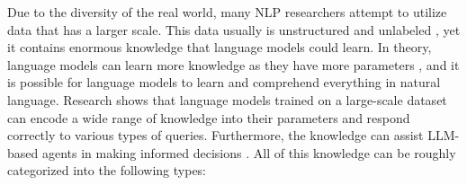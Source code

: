 Due to the diversity of the real world, many NLP researchers attempt to utilize data that has a larger scale. This data usually is unstructured and unlabeled \cite{DBLP:conf/naacl/HillCK16,DBLP:journals/jmlr/CollobertWBKKK11}, yet it contains enormous knowledge that language models could learn. In theory, language models can learn more knowledge as they have more parameters \cite{DBLP:journals/corr/abs-2001-08361}, and it is possible for language models to learn and comprehend everything in natural language. Research \cite{DBLP:conf/emnlp/RobertsRS20} shows that language models trained on a large-scale dataset can encode a wide range of knowledge into their parameters and respond correctly to various types of queries. Furthermore, the knowledge can assist LLM-based agents in making informed decisions \cite{DBLP:journals/expert/McShane09}. All of this knowledge can be roughly categorized into the following types:

